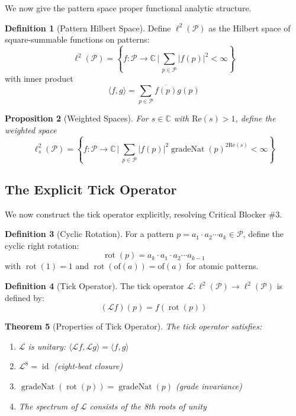 \documentclass[12pt]{article}
\newtheorem{theorem}{Theorem}[section]
\newtheorem{proposition}[theorem]{Proposition}
\theoremstyle{definition}
\newtheorem{definition}[theorem]{Definition}
\theoremstyle{remark}
\newcommand{\C}{\mathbb{C}}
\DeclareMathOperator{\gradeNat}{gradeNat}
\DeclareMathOperator{\id}{id}
\DeclareMathOperator{\rot}{rot}
\newcommand{\inner}[2]{\langle #1, #2 \rangle}
\newcommand{\tick}{\mathcal{L}}
\newcommand{\Pattern}{\mathcal{P}}
\begin{document}
We now give the pattern space proper functional analytic structure.

\begin{definition}[Pattern Hilbert Space]
Define $\ell^2(\Pattern)$ as the Hilbert space of square-summable functions on patterns:
$$\ell^2(\Pattern) = \left\{f: \Pattern \to \C \,\bigg|\, \sum_{p \in \Pattern} |f(p)|^2 < \infty\right\}$$
with inner product
$$\inner{f}{g} = \sum_{p \in \Pattern} \overline{f(p)}g(p)$$
\end{definition}

\begin{proposition}[Weighted Spaces]
For $s \in \C$ with $\text{Re}(s) > 1$, define the weighted space
$$\ell^2_s(\Pattern) = \left\{f: \Pattern \to \C \,\bigg|\, \sum_{p \in \Pattern} |f(p)|^2 \gradeNat(p)^{2\text{Re}(s)} < \infty\right\}$$
\end{proposition}

\subsection{The Explicit Tick Operator}

We now construct the tick operator explicitly, resolving Critical Blocker \#3.

\begin{definition}[Cyclic Rotation]
For a pattern $p = a_1 \cdot a_2 \cdots a_k \in \Pattern$, define the cyclic right rotation:
$$\rot(p) = a_k \cdot a_1 \cdot a_2 \cdots a_{k-1}$$
with $\rot(1) = 1$ and $\rot(\text{of}(a)) = \text{of}(a)$ for atomic patterns.
\end{definition}

\begin{definition}[Tick Operator]
The tick operator $\tick: \ell^2(\Pattern) \to \ell^2(\Pattern)$ is defined by:
$$(\tick f)(p) = f(\rot(p))$$
\end{definition}

\begin{theorem}[Properties of Tick Operator]
The tick operator satisfies:
\begin{enumerate}
\item $\tick$ is unitary: $\inner{\tick f}{\tick g} = \inner{f}{g}$
\item $\tick^8 = \id$ (eight-beat closure)
\item $\gradeNat(\rot(p)) = \gradeNat(p)$ (grade invariance)
\item The spectrum of $\tick$ consists of the 8th roots of unity
\end{enumerate}
\end{theorem}
\end{document}
